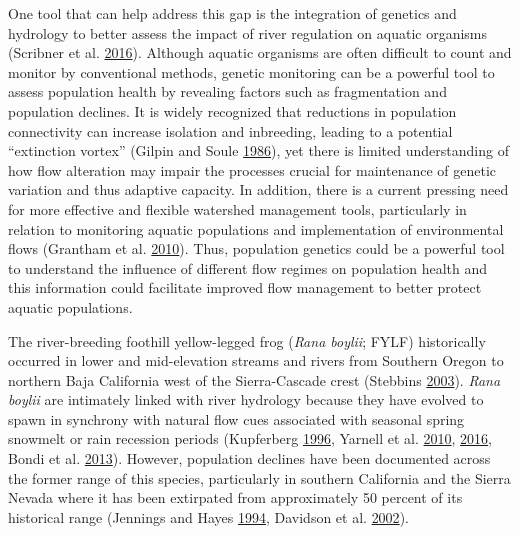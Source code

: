 \documentclass[proquest,12pt,final]{ucthesis-CA2012} %
\begin{document}
\begin{ucmainmatter}
One tool that can help address this gap is the integration of genetics
and hydrology to better assess the impact of river regulation on aquatic
organisms (Scribner et al.
\protect\hyperlink{ref-scribner_applications_2016}{2016}). Although
aquatic organisms are often difficult to count and monitor by
conventional methods, genetic monitoring can be a powerful tool to
assess population health by revealing factors such as fragmentation and
population declines. It is widely recognized that reductions in
population connectivity can increase isolation and inbreeding, leading
to a potential ``extinction vortex'' (Gilpin and Soule
\protect\hyperlink{ref-gilpin_minimum_1986}{1986}), yet there is limited
understanding of how flow alteration may impair the processes crucial
for maintenance of genetic variation and thus adaptive capacity. In
addition, there is a current pressing need for more effective and
flexible watershed management tools, particularly in relation to
monitoring aquatic populations and implementation of environmental flows
(Grantham et al. \protect\hyperlink{ref-grantham_climatic_2010}{2010}).
Thus, population genetics could be a powerful tool to understand the
influence of different flow regimes on population health and this
information could facilitate improved flow management to better protect
aquatic populations.

The river-breeding foothill yellow-legged frog (\emph{Rana boylii};
FYLF) historically occurred in lower and mid-elevation streams and
rivers from Southern Oregon to northern Baja California west of the
Sierra-Cascade crest (Stebbins
\protect\hyperlink{ref-stebbins_field_2003}{2003}). \emph{Rana boylii}
are intimately linked with river hydrology because they have evolved to
spawn in synchrony with natural flow cues associated with seasonal
spring snowmelt or rain recession periods (Kupferberg
\protect\hyperlink{ref-kupferberg_hydrologic_1996}{1996}, Yarnell et al.
\protect\hyperlink{ref-yarnell_ecology_2010}{2010},
\protect\hyperlink{ref-yarnell_management_2016}{2016}, Bondi et al.
\protect\hyperlink{ref-bondi_transferability_2013}{2013}). However,
population declines have been documented across the former range of this
species, particularly in southern California and the Sierra Nevada where
it has been extirpated from approximately 50 percent of its historical
range (Jennings and Hayes
\protect\hyperlink{ref-jennings_amphibian_1994}{1994}, Davidson et al.
\protect\hyperlink{ref-davidson_spatial_2002}{2002}).

\par


\end{ucmainmatter}
\end{document}
